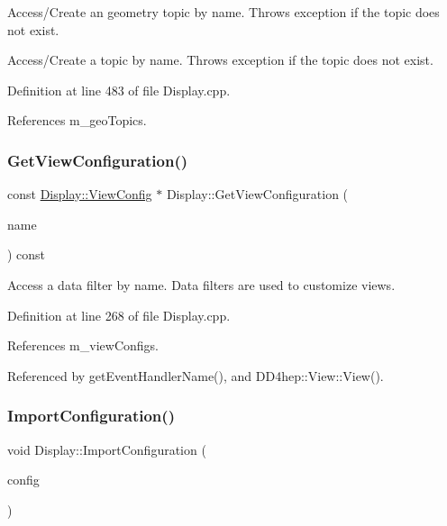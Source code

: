 Access/\+Create an geometry topic by name. Throws exception if the topic does not exist. 

Access/\+Create a topic by name. Throws exception if the topic does not exist. 

Definition at line 483 of file Display.\+cpp.



References m\+\_\+geo\+Topics.

\hypertarget{class_d_d4hep_1_1_display_ad73365feb14a5e6c5b493f3e78ce2e2b}{}\label{class_d_d4hep_1_1_display_ad73365feb14a5e6c5b493f3e78ce2e2b} 
\subsubsection{\texorpdfstring{Get\+View\+Configuration()}{GetViewConfiguration()}}
{\footnotesize\ttfamily const \hyperlink{class_d_d4hep_1_1_display_a7be76e4de32d9d1084a6ca2f52669f68}{Display\+::\+View\+Config} $\ast$ Display\+::\+Get\+View\+Configuration (\begin{DoxyParamCaption}\item[{const std\+::string \&}]{name }\end{DoxyParamCaption}) const}



Access a data filter by name. Data filters are used to customize views. 



Definition at line 268 of file Display.\+cpp.



References m\+\_\+view\+Configs.



Referenced by get\+Event\+Handler\+Name(), and D\+D4hep\+::\+View\+::\+View().

\hypertarget{class_d_d4hep_1_1_display_a3dfe74c5f4b7f1547ccf07ccba8b6d39}{}\label{class_d_d4hep_1_1_display_a3dfe74c5f4b7f1547ccf07ccba8b6d39} 
\subsubsection{\texorpdfstring{Import\+Configuration()}{ImportConfiguration()}}
{\footnotesize\ttfamily void Display\+::\+Import\+Configuration (\begin{DoxyParamCaption}\item[{const \hyperlink{class_d_d4hep_1_1_display_configuration}{Display\+Configuration} \&}]{config }\end{DoxyParamCaption})}



